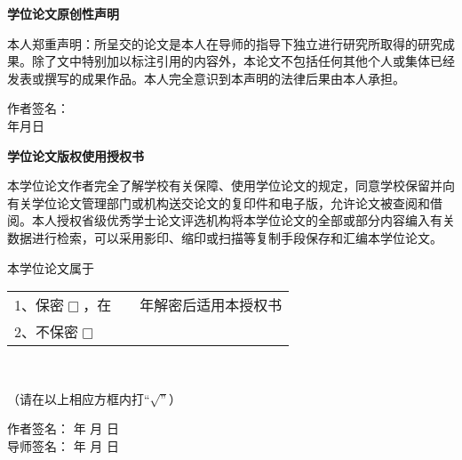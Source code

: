 \begin{spacing}{2.0}
\begin{center}
\heiti {} \textbf{学位论文原创性声明}
\end{center}

本人郑重声明：所呈交的论文是本人在导师的指导下独立进行研究所取得的研究成果。除了文中特别加以标注引用的内容外，本论文不包括任何其他个人或集体已经发表或撰写的成果作品。本人完全意识到本声明的法律后果由本人承担。 
\begin{flushright}
作者签名：\qquad\qquad\qquad\qquad \\

年\qquad 月\qquad 日
\end{flushright}
\vskip 2cm
\begin{center}
\heiti {} \textbf{学位论文版权使用授权书}
\end{center}

本学位论文作者完全了解学校有关保障、使用学位论文的规定，同意学校保留并向有关学位论文管理部门或机构送交论文的复印件和电子版，允许论文被查阅和借阅。本人授权省级优秀学士论文评选机构将本学位论文的全部或部分内容编入有关数据进行检索，可以采用影印、缩印或扫描等复制手段保存和汇编本学位论文。
\smallskip

本学位论文属于
\begin{tabular}[t]{l}
1、保密$ \Box$，在~~~~年解密后适用本授权书  \\ 
2、不保密$ \Box$  \\ 
\end{tabular} \\
\begin{center}
（请在以上相应方框内打“$\surd”$）
\end{center}
\begin{flushright}
 作者签名：  \quad\quad\quad\quad\quad 年 \quad  月  \quad  日\\
导师签名：   \quad\quad\quad\quad\quad 年 \quad  月 \quad   日\\
\end{flushright}
\end{spacing}
\thispagestyle{empty}
\clearpage